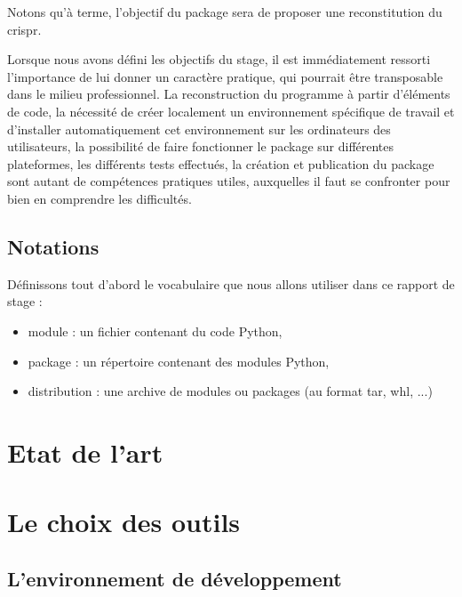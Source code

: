 \documentclass[twoside,a4paper,11pt,frenchb,openany]{report}
\begin{document}
Notons qu'à terme, l'objectif du package sera de proposer une reconstitution du crispr.

Lorsque nous avons défini les objectifs du stage, il est immédiatement ressorti l'importance de lui donner un caractère pratique, qui pourrait être transposable dans le milieu professionnel. La reconstruction du programme à partir d'éléments de code, la nécessité de créer localement un environnement spécifique de travail et d'installer automatiquement cet environnement sur les ordinateurs des utilisateurs, la possibilité de faire fonctionner le package sur différentes plateformes, les différents tests effectués, la création et publication du package sont autant de compétences pratiques utiles, auxquelles il faut se confronter pour bien en comprendre les difficultés.



\section{Notations}

Définissons tout d'abord le vocabulaire que nous allons utiliser dans ce rapport de stage :
\begin{itemize}
\item module : un fichier contenant du code Python,
\item package : un répertoire contenant des modules Python,
\item distribution : une archive de modules ou packages (au format tar, whl, ...)
\end{itemize}



\chapter{Etat de l'art}


	

\chapter{Le choix des outils}




\section{L'environnement de développement}
\end{document}
